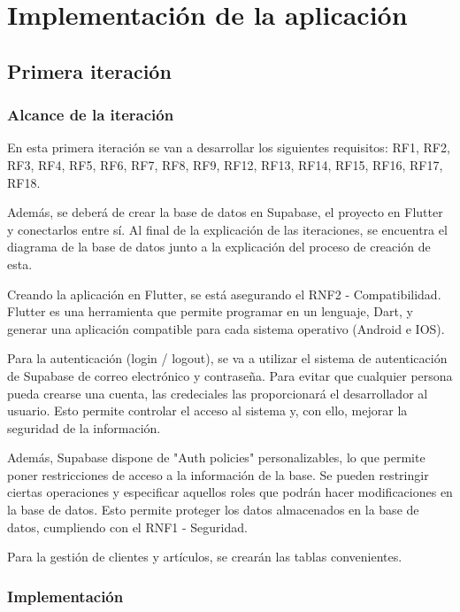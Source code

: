 \chapter{Implementación de la aplicación}
\label{chap:appvalidation}

\section{Primera iteración}

\subsection{Alcance de la iteración}

En esta primera iteración se van a desarrollar los siguientes requisitos: RF1, RF2, RF3, RF4, RF5, RF6, RF7, RF8, RF9, RF12, RF13, RF14, RF15, RF16, RF17, RF18. 

Además, se deberá de crear la base de datos en Supabase, el proyecto en Flutter y conectarlos entre sí. Al final de la explicación de las iteraciones, se encuentra el diagrama de la base de datos junto a la explicación del proceso de creación de esta. 

Creando la aplicación en Flutter, se está asegurando el RNF2 - Compatibilidad. Flutter es una herramienta que permite programar en un lenguaje, Dart, y generar una aplicación compatible para cada sistema operativo (Android e IOS). 

Para la autenticación  (login / logout), se va a utilizar el sistema de autenticación de Supabase de correo electrónico y contraseña. Para evitar que cualquier persona pueda crearse una cuenta, las credeciales las proporcionará el desarrollador al usuario. Esto permite controlar el acceso al sistema y, con ello, mejorar la seguridad de la información. 

Además, Supabase dispone de "Auth policies" personalizables, lo que permite poner restricciones de acceso a la información de la base. Se pueden restringir ciertas operaciones y especificar aquellos roles que podrán hacer modificaciones en la base de datos. Esto permite proteger los datos almacenados en la base de datos, cumpliendo con el RNF1 - Seguridad. 

Para la gestión de clientes y artículos, se crearán las tablas convenientes. 

\subsection{Implementación}

